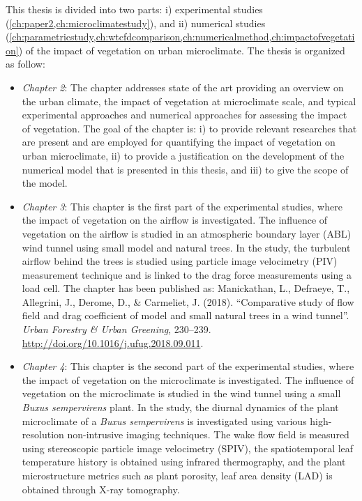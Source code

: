 This thesis is divided into two parts: i) experimental studies (\cref{ch:paper2,ch:microclimatestudy}), and ii) numerical studies (\cref{ch:parametricstudy,ch:wtcfdcomparison,ch:numericalmethod,ch:impactofvegetation}) of the impact of vegetation on urban microclimate. The thesis is organized as follow:
\begin{itemize}
	\item \textit{Chapter 2}: The chapter addresses state of the art providing an overview on the urban climate, the impact of vegetation at microclimate scale, and typical experimental approaches and numerical approaches for assessing the impact of vegetation. The goal of the chapter is: i) to provide relevant researches that are present and are employed for quantifying the impact of vegetation on urban microclimate, ii) to provide a justification on the development of the numerical model that is presented in this thesis, and iii) to give the scope of the model. 

	\item \textit{Chapter 3}: This chapter is the first part of the experimental studies, where the impact of vegetation on the airflow is investigated. The influence of vegetation on the airflow is studied in an atmospheric boundary layer (ABL) wind tunnel using small model and natural trees. In the study, the turbulent airflow behind the trees is studied using particle image velocimetry (PIV) measurement technique and is linked to the drag force measurements using a load cell. The chapter has been published as: Manickathan, L., Defraeye, T., Allegrini, J., Derome, D., \& Carmeliet, J. (2018). ``Comparative study of flow field and drag coefficient of model and small natural trees in a wind tunnel''. \textit{Urban Forestry \& Urban Greening}, 230–239. \url{http://doi.org/10.1016/j.ufug.2018.09.011}.	

	\item \textit{Chapter 4}: This chapter is the second part of the experimental studies, where the impact of vegetation on the microclimate is investigated. The influence of vegetation on the microclimate is studied in the wind tunnel using a small \textit{Buxus sempervirens} plant. In the study, the diurnal dynamics of the plant microclimate of a \textit{Buxus sempervirens} is investigated using various high-resolution non-intrusive imaging techniques. The wake flow field is measured using stereoscopic particle image velocimetry (SPIV), the spatiotemporal leaf temperature history is obtained using infrared thermography, and the plant microstructure metrics such as plant porosity, leaf area density (LAD) is obtained through X-ray tomography.


\end{itemize}
